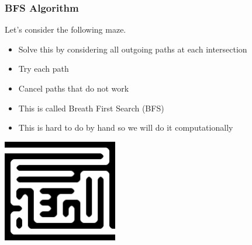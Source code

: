 \documentclass{beamer}
\begin{document}
            \begin{frame}
                \frametitle{BFS Algorithm}
                Let's consider the following maze.
                \begin{itemize}
                    \item Solve this by considering all outgoing paths at each intersection
                    \item Try each path
                    \item Cancel paths that do not work
                    \item This is called Breath First Search (BFS)
                    \item This is hard to do by hand so we will do it computationally
    
                \end{itemize}
                \includegraphics[width=5cm]{figures/maze_bfs_lg.png}

            
                
                \end{frame}
    

                
\end{document}
